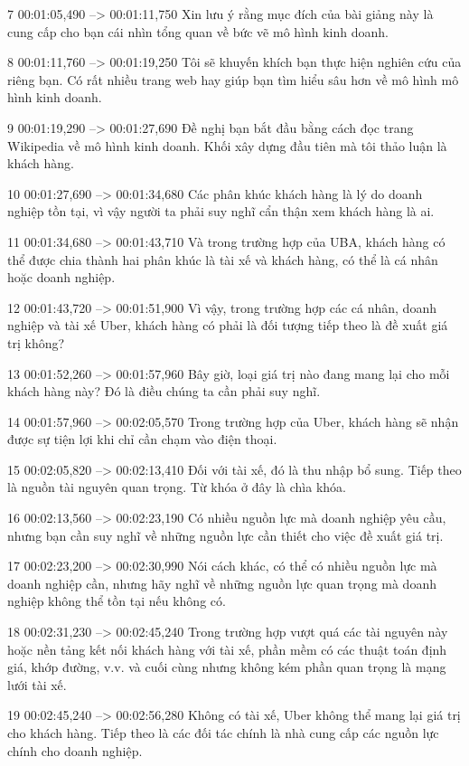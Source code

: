 7
00:01:05,490 --> 00:01:11,750
Xin lưu ý rằng mục đích của bài giảng này là cung cấp cho bạn cái nhìn tổng quan về bức vẽ mô hình kinh doanh.

8
00:01:11,760 --> 00:01:19,250
Tôi sẽ khuyến khích bạn thực hiện nghiên cứu của riêng bạn.  Có rất nhiều trang web hay giúp bạn tìm hiểu sâu hơn về mô hình mô hình kinh doanh.

9
00:01:19,290 --> 00:01:27,690
Đề nghị bạn bắt đầu bằng cách đọc trang Wikipedia về mô hình kinh doanh.  Khối xây dựng đầu tiên mà tôi thảo luận là khách hàng.

10
00:01:27,690 --> 00:01:34,680
Các phân khúc khách hàng là lý do doanh nghiệp tồn tại, vì vậy người ta phải suy nghĩ cẩn thận xem khách hàng là ai.

11
00:01:34,680 --> 00:01:43,710
Và trong trường hợp của UBA, khách hàng có thể được chia thành hai phân khúc là tài xế và khách hàng, có thể là cá nhân hoặc doanh nghiệp.

12
00:01:43,720 --> 00:01:51,900
Vì vậy, trong trường hợp các cá nhân, doanh nghiệp và tài xế Uber, khách hàng có phải là đối tượng tiếp theo là đề xuất giá trị không?

13
00:01:52,260 --> 00:01:57,960
Bây giờ, loại giá trị nào đang mang lại cho mỗi khách hàng này?  Đó là điều chúng ta cần phải suy nghĩ.

14
00:01:57,960 --> 00:02:05,570
Trong trường hợp của Uber, khách hàng sẽ nhận được sự tiện lợi khi chỉ cần chạm vào điện thoại.

15
00:02:05,820 --> 00:02:13,410
Đối với tài xế, đó là thu nhập bổ sung.  Tiếp theo là nguồn tài nguyên quan trọng.  Từ khóa ở đây là chìa khóa.

16
00:02:13,560 --> 00:02:23,190
Có nhiều nguồn lực mà doanh nghiệp yêu cầu, nhưng bạn cần suy nghĩ về những nguồn lực cần thiết cho việc đề xuất giá trị.

17
00:02:23,200 --> 00:02:30,990
Nói cách khác, có thể có nhiều nguồn lực mà doanh nghiệp cần, nhưng hãy nghĩ về những nguồn lực quan trọng mà doanh nghiệp không thể tồn tại nếu không có.

18
00:02:31,230 --> 00:02:45,240
Trong trường hợp vượt quá các tài nguyên này hoặc nền tảng kết nối khách hàng với tài xế, phần mềm có các thuật toán định giá, khớp đường, v.v. và cuối cùng nhưng không kém phần quan trọng là mạng lưới tài xế.

19
00:02:45,240 --> 00:02:56,280
Không có tài xế, Uber không thể mang lại giá trị cho khách hàng.  Tiếp theo là các đối tác chính là nhà cung cấp các nguồn lực chính cho doanh nghiệp.

